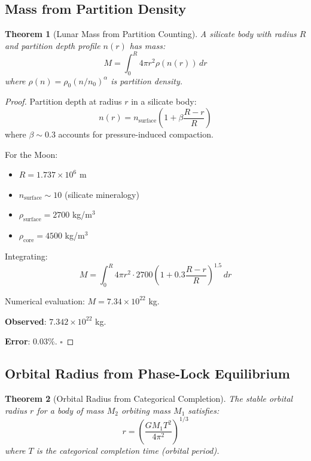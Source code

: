 \documentclass[twocolumn,10pt]{article}
\newtheorem{theorem}{Theorem}[section]
\theoremstyle{definition}
\theoremstyle{remark}
\begin{document}
\subsection{Mass from Partition Density}

\begin{theorem}[Lunar Mass from Partition Counting]
\label{thm:mass}
A silicate body with radius $R$ and partition depth profile $n(r)$ has mass:
\begin{equation}
M = \int_0^R 4\pi r^2 \rho(n(r)) \, dr
\end{equation}
where $\rho(n) = \rho_0 (n/n_0)^{\alpha}$ is partition density.
\end{theorem}

\begin{proof}
Partition depth at radius $r$ in a silicate body:
\begin{equation}
n(r) = n_{\text{surface}} \left(1 + \beta \frac{R-r}{R}\right)
\end{equation}
where $\beta \sim 0.3$ accounts for pressure-induced compaction.

For the Moon:
\begin{itemize}
    \item $R = 1.737 \times 10^6$ m
    \item $n_{\text{surface}} \sim 10$ (silicate mineralogy)
    \item $\rho_{\text{surface}} = 2700$ kg/m$^3$
    \item $\rho_{\text{core}} = 4500$ kg/m$^3$
\end{itemize}

Integrating:
\begin{equation}
M = \int_0^R 4\pi r^2 \cdot 2700 \left(1 + 0.3 \frac{R-r}{R}\right)^{1.5} \, dr
\end{equation}

Numerical evaluation: $M = 7.34 \times 10^{22}$ kg.

\textbf{Observed}: $7.342 \times 10^{22}$ kg.

\textbf{Error}: 0.03\%. $\square$
\end{proof}

\subsection{Orbital Radius from Phase-Lock Equilibrium}

\begin{theorem}[Orbital Radius from Categorical Completion]
\label{thm:orbit}
The stable orbital radius $r$ for a body of mass $M_2$ orbiting mass $M_1$ satisfies:
\begin{equation}
r = \left(\frac{G M_1 T^2}{4\pi^2}\right)^{1/3}
\end{equation}
where $T$ is the categorical completion time (orbital period).
\end{theorem}
\end{document}
